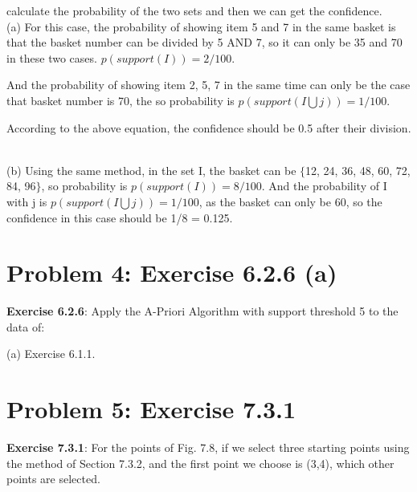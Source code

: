 \documentclass{article}
\begin{document}
calculate the probability of the two sets and then we can get the confidence.
~\\

(a) For this case, the probability of showing item 5 and 7 in the same basket is that the basket number can be divided by 5 AND 7, so it can only be 35 and 70 in these two cases. $p(support(I)) = 2/100$.

And the probability of showing item 2, 5, 7 in the same time can only be the case that basket number is 70, the so probability is $p(support(I \bigcup j)) = 1/100$.

According to the above equation, the confidence should be 0.5 after their division.

~\\
(b) Using the same method, in the set I, the basket can be $\{$12, 24, 36, 48, 60, 72, 84, 96$\}$, so probability is $p(support(I)) = 8/100$. And the probability of I with j is $p(support(I \bigcup j)) =  1/100$, as the basket can only be 60, so the confidence in this case should be 1/8 = 0.125.



\section{Problem 4: Exercise 6.2.6 (a)}

\textbf{Exercise 6.2.6}: Apply the A-Priori Algorithm with support threshold 5 to the data of:

(a) Exercise 6.1.1.



\section{Problem 5: Exercise 7.3.1}


\textbf{Exercise 7.3.1}: For the points of Fig. 7.8, if we select three starting points using the method
of Section 7.3.2, and the first point we choose is (3,4), which other points are selected.
\end{document}

